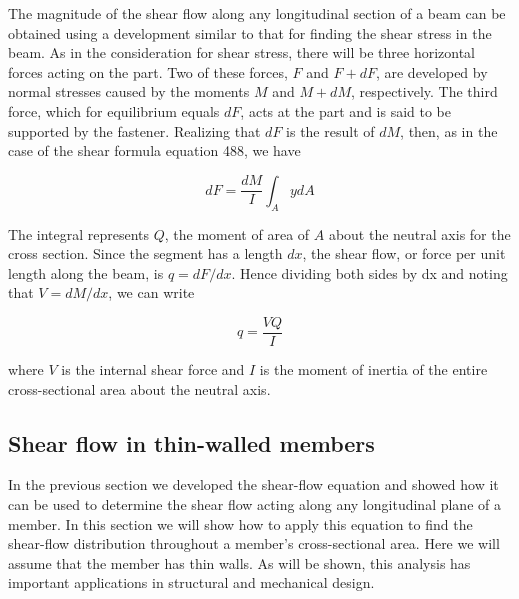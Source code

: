 \documentclass[
fontsize=10pt,
a4paper,
twosides=false,
open=any,
svgnames,
]{kaobook} %
\begin{document}
The magnitude of the shear flow along any longitudinal section of a beam can be obtained using a development similar to that for finding the shear stress in the beam. As in the consideration for shear stress, there will be three horizontal forces acting on the part. Two of these forces, $F$ and $F + dF$, are developed by normal stresses caused by the moments $M$ and $M + dM$, respectively. The third force, which for equilibrium equals $dF$, acts at the part and is said to be supported by the fastener.  Realizing that $dF$ is the result of $dM$, then, as in the case of the shear formula equation 488, we have

\begin{equation*}
  dF = \frac{dM}{I}\int_A ydA
\end{equation*}

The integral represents $Q$, the moment of area of $A$ about the neutral axis for the cross section. Since the segment has a length $dx$, the shear flow, or force per unit length along the beam, is $q = dF/dx$. Hence dividing both sides by dx and noting that $V = dM/dx$, we can write

\[q = \frac{VQ}{I}\]

where $V$ is the internal shear force and $I$ is the moment of inertia of the entire cross-sectional area about the neutral axis.

\subsection{Shear flow in thin-walled members}

In the previous section we developed the shear-flow equation and showed how it can be used to determine the shear flow acting along any longitudinal plane of a member. In this section we will show how to apply this equation to find the shear-flow distribution throughout a member’s cross-sectional area. Here we will assume that the member has thin walls. As will be shown, this analysis has important applications in structural and mechanical design.
\end{document}
